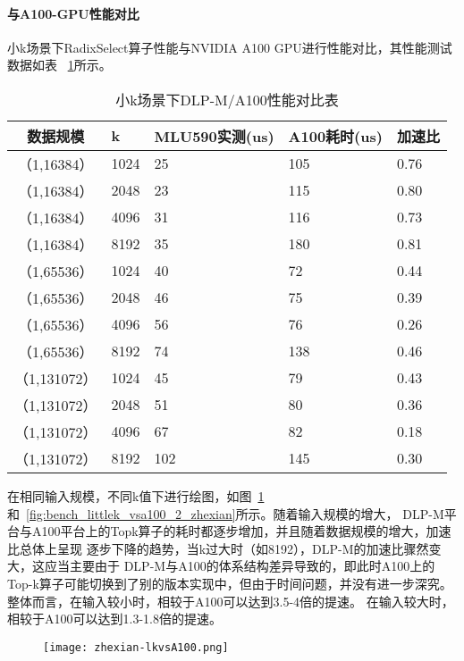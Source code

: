 \paragraph{与A100-GPU性能对比}
小k场景下RadixSelect算子性能与NVIDIA A100 GPU进行性能对比，其性能测试数据如表
~\ref{tab:lkvsa100}所示。
\begin{table}
    \centering
    \caption{小k场景下DLP-M/A100性能对比表}
    \begin{tabular}{cllll}
    \toprule
    数据规模 & k &   MLU590实测(us) & A100耗时(us) & 加速比 \\
    \midrule
    （1,16384） & 1024    & 25 & 105 & 0.76 \\
    （1,16384） & 2048   & 23 & 115 & 0.80 \\
    （1,16384） & 4096   & 31 & 116 & 0.73 \\
    （1,16384） & 8192   & 35 & 180 & 0.81 \\
    （1,65536） & 1024    & 40 & 72 & 0.44 \\
    （1,65536） & 2048    & 46 & 75 & 0.39 \\
    （1,65536） & 4096    & 56 & 76 & 0.26 \\
    （1,65536） & 8192   & 74 & 138 & 0.46 \\

    （1,131072） & 1024    & 45 & 79 & 0.43 \\
    （1,131072） & 2048    & 51 & 80 & 0.36 \\
    （1,131072） & 4096    & 67 & 82 & 0.18 \\
    （1,131072） & 8192   & 102 & 145 & 0.30 \\
    
    \bottomrule
    \end{tabular}
\label{tab:lkvsa100}    
\end{table}
    
    在相同输入规模，不同k值下进行绘图，如图~\ref{fig:bench_littlek_vsa100_zhexian}
    和~\ref{fig:bench_littlek_vsa100_2_zhexian}所示。随着输入规模的增大，
    DLP-M平台与A100平台上的Topk算子的耗时都逐步增加，并且随着数据规模的增大，加速比总体上呈现
    逐步下降的趋势，当k过大时（如8192），DLP-M的加速比骤然变大，这应当主要由于
    DLP-M与A100的体系结构差异导致的，即此时A100上的Top-k算子可能切换到了别的版本实现中，但由于时间问题，并没有进一步深究。
    整体而言，在输入较小时，相较于A100可以达到3.5-4倍的提速。
    在输入较大时，相较于A100可以达到1.3-1.8倍的提速。

    \begin{figure}[ht]
        \centering
        \texttt{[image: zhexian-lkvsA100.png]}
        \label{fig:bench_littlek_vsa100_zhexian}
    \end{figure}
    
